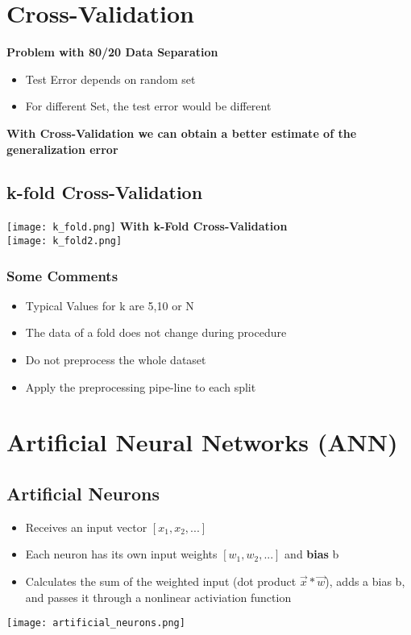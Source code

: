 \section{Cross-Validation}
\textbf{Problem with 80/20 Data Separation}
\begin{itemize}
    \item Test Error depends on random set
    \item For different Set, the test error would be different
\end{itemize}
\textbf{With Cross-Validation we can obtain a better estimate of the generalization error}

\columnbreak
\subsection{k-fold Cross-Validation}
\texttt{[image: k\_fold.png]}
\textbf{With k-Fold Cross-Validation}\\
\texttt{[image: k\_fold2.png]}

\subsubsection{Some Comments}
\begin{itemize}
    \item Typical Values for k are 5,10 or N
    \item The data of a fold does not change during procedure
    \item Do not preprocess the whole dataset
    \item Apply the preprocessing pipe-line to each split
\end{itemize}

\section{Artificial Neural Networks (ANN)}
\subsection{Artificial Neurons}
\begin{itemize}
    \item Receives an input vector $[x_1,x_2, ...]$
    \item Each neuron has its own input weights $[w_1, w_2, ...]$ and \textbf{bias} b
    \item Calculates the sum of the weighted input (dot product $\vec{x} * \vec{w}$), adds a bias b, and passes it through a nonlinear activiation function
\end{itemize}
\texttt{[image: artificial\_neurons.png]}

